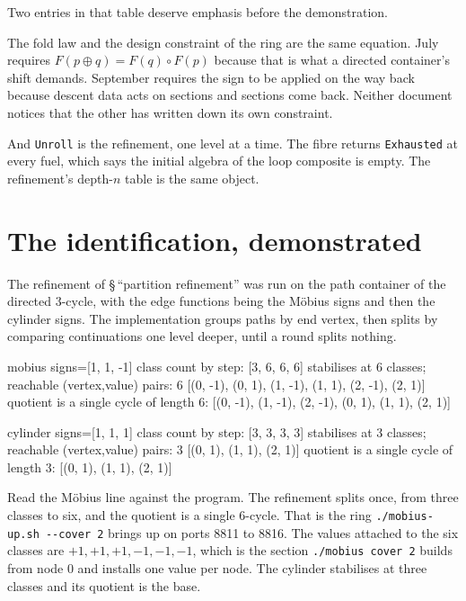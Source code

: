\documentclass[11pt,a4paper]{article}
\begin{document}
Two entries in that table deserve emphasis before the demonstration.

The fold law and the design constraint of the ring are the same equation. July
requires $F(p \oplus q) = F(q) \circ F(p)$ because that is what a directed
container's shift demands. September requires the sign to be applied on the way
back because descent data acts on sections and sections come back. Neither
document notices that the other has written down its own constraint.

And \verb|Unroll| is the refinement, one level at a time. The fibre returns
\verb|Exhausted| at every fuel, which says the initial algebra of the loop
composite is empty. The refinement's depth-$n$ table is the same object.

\section{The identification, demonstrated}

The refinement of \S\,``partition refinement'' was run on the path container of
the directed 3-cycle, with the edge functions being the M\"obius signs and then
the cylinder signs. The implementation groups paths by end vertex, then splits by
comparing continuations one level deeper, until a round splits nothing.

\begin{term}
mobius     signs=[1, 1, -1]  class count by step: [3, 6, 6, 6]
           stabilises at 6 classes;  reachable (vertex,value) pairs: 6
           [(0, -1), (0, 1), (1, -1), (1, 1), (2, -1), (2, 1)]
           quotient is a single cycle of length 6: [(0, -1), (1, -1), (2, -1), (0, 1), (1, 1), (2, 1)]

cylinder   signs=[1, 1, 1]  class count by step: [3, 3, 3, 3]
           stabilises at 3 classes;  reachable (vertex,value) pairs: 3
           [(0, 1), (1, 1), (2, 1)]
           quotient is a single cycle of length 3: [(0, 1), (1, 1), (2, 1)]
\end{term}

Read the M\"obius line against the program. The refinement splits once, from
three classes to six, and the quotient is a single 6-cycle. That is the ring
\texttt{./mobius-up.sh -\/-cover 2} brings up on ports 8811 to 8816. The values
attached to the six classes are $+1,+1,+1,-1,-1,-1$, which is the section
\texttt{./mobius cover 2} builds from node $0$ and installs one value per node.
The cylinder stabilises at three classes and its quotient is the base.
\end{document}
